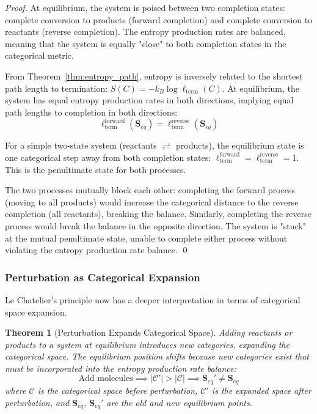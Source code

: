 \documentclass[12pt,a4paper]{article}
\newtheorem{theorem}{Theorem}[section]
\theoremstyle{definition}
\theoremstyle{remark}
\begin{document}
\begin{proof}
At equilibrium, the system is poised between two completion states: complete conversion to products (forward completion) and complete conversion to reactants (reverse completion). The entropy production rates are balanced, meaning that the system is equally "close" to both completion states in the categorical metric.

From Theorem~\ref{thm:entropy_path}, entropy is inversely related to the shortest path length to termination: $S(C) = -k_B \log \ell_{\text{term}}(C)$. At equilibrium, the system has equal entropy production rates in both directions, implying equal path lengths to completion in both directions:
\begin{equation}
\ell_{\text{term}}^{\text{forward}}(\mathbf{S}_{eq}) = \ell_{\text{term}}^{\text{reverse}}(\mathbf{S}_{eq})
\end{equation}

For a simple two-state system (reactants $\rightleftharpoons$ products), the equilibrium state is one categorical step away from both completion states: $\ell_{\text{term}}^{\text{forward}} = \ell_{\text{term}}^{\text{reverse}} = 1$. This is the penultimate state for both processes.

The two processes mutually block each other: completing the forward process (moving to all products) would increase the categorical distance to the reverse completion (all reactants), breaking the balance. Similarly, completing the reverse process would break the balance in the opposite direction. The system is "stuck" at the mutual penultimate state, unable to complete either process without violating the entropy production rate balance. \qed
\end{proof}

\subsubsection{Perturbation as Categorical Expansion}

Le Chatelier's principle now has a deeper interpretation in terms of categorical space expansion.

\begin{theorem}[Perturbation Expands Categorical Space]
\label{thm:perturbation_expansion}
Adding reactants or products to a system at equilibrium introduces new categories, expanding the categorical space. The equilibrium position shifts because new categories exist that must be incorporated into the entropy production rate balance:
\begin{equation}
\text{Add molecules} \implies |\mathcal{C}'| > |\mathcal{C}| \implies \mathbf{S}_{eq}' \neq \mathbf{S}_{eq}
\label{eq:perturbation_expansion}
\end{equation}
where $\mathcal{C}$ is the categorical space before perturbation, $\mathcal{C}'$ is the expanded space after perturbation, and $\mathbf{S}_{eq}$, $\mathbf{S}_{eq}'$ are the old and new equilibrium points.
\end{theorem}
\end{document}
